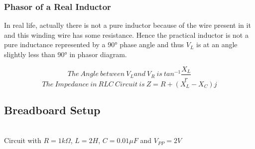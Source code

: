 \documentclass{article}
\begin{document}
\subsubsection{Phasor of a Real Inductor}
\begin{figure}
\end{figure}
In real life, actually there is not a pure inductor because of the wire present in it and this winding wire has some resistance. Hence the practical inductor is not a pure inductance represented by a \ang{90} phase angle and thus $V_L$ is at an angle slightly less than \ang{90} in phasor diagram.

\noindent
\[The \ Angle \ between \ V_L and \ V_R \ is \ tan^{-1}\frac{X_L}{r}\]
\[The \ Impedance \ in \ RLC\ Circuit\ is \ Z=R+(X_L- X_C)j\]

\subsection{Breadboard Setup}
\vspace{5px}

\begin{center}
 \\ \vspace{5px}
Circuit with $R=1 k\Omega$, $L=2H$, $C= 0.01 \mu F$ and $V_{PP}=2V$ \\
\end{center}
\end{document}
